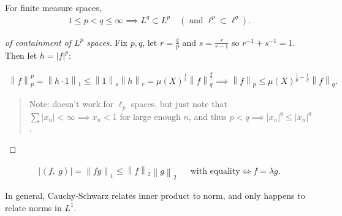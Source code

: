 \begin{example}

For finite measure spaces,
\begin{align*}
1 \leq p < q \leq \infty \implies L^q \subset L^p \quad (\text{ and } \ell^p \subset \ell^q)
.\end{align*}

\end{example}

\begin{proof}[of containment of $L^p$ spaces]

Fix \(p, q\), let \(r = \frac q p\) and \(s = \frac{r}{r-1}\) so
\(r^{-1}+ s^{-1}= 1\). Then let
\(h = {\left\lvert {f} \right\rvert}^p\):

\begin{align*}  
{\left\lVert {f} \right\rVert}_{p}^p 
= {\left\lVert {h\cdot 1} \right\rVert}_{1} \leq {\left\lVert {1} \right\rVert}_{s} {\left\lVert {h} \right\rVert}_{r} 
= \mu(X)^{\frac 1 s} {\left\lVert {f} \right\rVert}_{q}^{\frac q r}
\implies {\left\lVert {f} \right\rVert}_{p} 
\leq \mu(X)^{\frac 1 p - \frac 1 q} {\left\lVert {f} \right\rVert}_{q}
.\end{align*}

\begin{quote}
Note: doesn't work for \(\ell_p\) spaces, but just note that
\(\sum {\left\lvert {x_n} \right\rvert} < \infty \implies x_n < 1\) for
large enough \(n\), and thus
\(p<q \implies {\left\lvert {x_n} \right\rvert}^q \leq {\left\lvert {x_n} \right\rvert}^q\).
\end{quote}

\end{proof}

\begin{proposition}

\begin{align*}  
{\left\lvert {{\left\langle {f},~{g} \right\rangle}} \right\rvert} = {\left\lVert {fg} \right\rVert}_{1} \leq {\left\lVert {f} \right\rVert}_{2} {\left\lVert {g} \right\rVert}_{2}
&& \text{with equality} \iff f = \lambda g
.\end{align*}

\end{proposition}

\begin{remark}

In general, Cauchy-Schwarz relates inner product to norm, and only
happens to relate norms in \(L^1\).

\end{remark}

